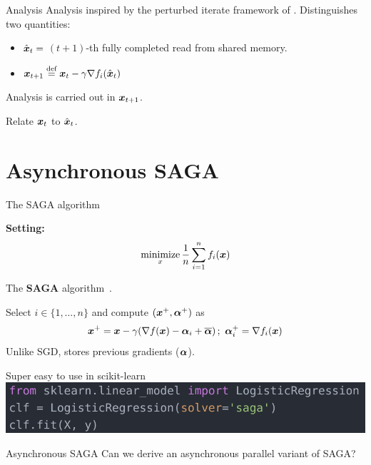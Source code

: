 \documentclass[10pt]{beamer}
\let\oldparencite=\parencite
\renewcommand{\parencite}[1]{\textcolor[rgb]{.7,.7,.7}{\oldparencite{#1}}}
\begin{document}
\begin{frame}{Analysis}
Analysis inspired by the perturbed iterate framework of \parencite{mania2015perturbed}. Distinguishes two quantities:
\begin{itemize}
\item $\hat{{\boldsymbol x}}_t =$ $(t+1)$-th fully completed read from shared memory. 
\item ${\boldsymbol x}_{t+1} \stackrel{\text{def}}{=} {\boldsymbol x}_{t} - \gamma \nabla f_i(\hat{{\boldsymbol x}}_t)$
\end{itemize}

Analysis is carried out in ${\boldsymbol x}_{t+1}$.

Relate ${\boldsymbol x}_t$ to $\hat{{\boldsymbol x}}_t$.
\end{frame}

\section{Asynchronous SAGA}


\begin{frame}{The SAGA algorithm}

{\bfseries Setting:}
$$
\operatorname*{minimize}_x \frac{1}{n} \sum_{i=1}^n f_i({\boldsymbol x})
$$ 

The {\bfseries SAGA} algorithm~\parencite{defazio2014saga}.

Select $i \in \{1, \ldots, n\}$ and compute $({\boldsymbol x}^+, {\boldsymbol \alpha}^+)$ as
$$
{\boldsymbol x}^+ = {\boldsymbol x} - \gamma (\nabla f({\boldsymbol x}) - {\boldsymbol \alpha}_i + \overline{{\boldsymbol \alpha}})\,;~{\boldsymbol \alpha}_i^+ = \nabla f_i({\boldsymbol x})
$$
Unlike SGD, stores previous gradients (${\boldsymbol \alpha}$).
\vspace{1em}\pause

\begin{alertblock}{Super easy to use in scikit-learn}
\includegraphics[width=0.8\linewidth]{img/code}
\end{alertblock}
\end{frame}


\begin{frame}{Asynchronous SAGA}
Can we derive an asynchronous parallel variant of SAGA?

\end{frame}
\end{document}
